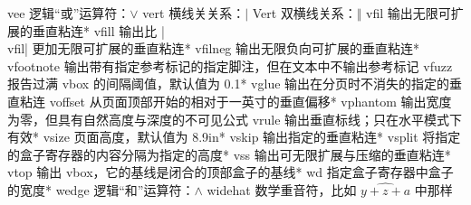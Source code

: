 \capcs vee {逻辑“或”运算符：$\vee$}{}{}
\capcs vert {横线关关系：$\vert$}{}{}
\capcs Vert {双横线关系：$\Vert$}{}{}
\capcs vfil {输出无限可扩展的垂直粘连}*{}
\capcs vfill {输出比 |\\vfil| 更加无限可扩展的垂直粘连}*{}
\capcs vfilneg {输出无限负向可扩展的垂直粘连}*{}
\capcs vfootnote {输出带有指定参考标记的指定脚注，但在文本中不输出参考标记}{}{}
\capcs vfuzz {报告过满 vbox 的间隔阈值，默认值为 0.1\pt}*{}
\capcs vglue {输出在分页时不消失的指定的垂直粘连}{}{}
\capcs voffset {从页面顶部开始的相对于一英寸的垂直偏移}*{}
\capcs vphantom {输出宽度为零，但具有自然高度与深度的不可见公式}{}{}
\capcs vrule {输出垂直标线；只在水平模式下有效}*{}
\capcs vsize {页面高度，默认值为 8.9\thinspace in}*{}
\capcs vskip {输出指定的垂直粘连}*{}
\capcs vsplit {将指定的盒子寄存器的内容分隔为指定的高度}*{}
\capcs vss {输出可无限扩展与压缩的垂直粘连}*{}
\capcs vtop {输出 vbox，它的基线是闭合的顶部盒子的基线}*{}
\capcs wd {指定盒子寄存器中盒子的宽度}*{}
\capcs wedge {逻辑“和”运算符：$\wedge$}{}{}
\capcs widehat {数学重音符，比如 $\widehat {y+z+a}$ 中那样}{}{}
